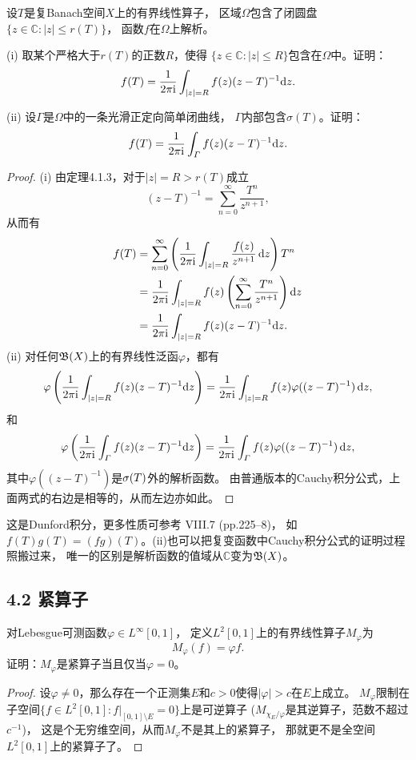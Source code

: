 \begin{21}
    设$T$是复Banach空间$X$上的有界线性算子，
    区域$\varOmega$包含了闭圆盘$\{z\in\mathbb{C}:|z|\leqslant r(T)\}$，
    函数$f$在$\varOmega$上解析。

    (i) 取某个严格大于$r(T)$的正数$R$，使得
    $\{z\in\mathbb{C}:|z|\leqslant R\}$包含在$\varOmega$中。证明：
    \[f(T)=\frac{1}{2\pi{\rm i}}\int_{|z|=R}f(z)(z-T)^{-1}{\rm d}z.\]

    (ii) 设$\varGamma$是$\varOmega$中的一条光滑正定向简单闭曲线，
    $\varGamma$内部包含$\sigma(T)$。证明：
    \[f(T)=\frac{1}{2\pi{\rm i}}\int_{\varGamma}f(z)(z-T)^{-1}{\rm d}z.\]
\end{21}
\begin{proof}
    (i) 由定理4.1.3，对于$|z|=R>r(T)$成立
    \[(z-T)^{-1}=\sum_{n=0}^{\infty}\frac{T^n}{z^{n+1}},\]
    从而有
    \begin{align*}
        f(T)&=\sum_{n=0}^{\infty}\left(\frac{1}{2\pi{\rm i}}\int_{|z|=R}\frac{f(z)}{z^{n+1}}\,{\rm d}z\right)T^n\\
        &=\frac{1}{2\pi{\rm i}}\int_{|z|=R}f(z)\left(\sum_{n=0}^{\infty}\frac{T^n}{z^{n+1}}\right){\rm d}z\\
        &=\frac{1}{2\pi{\rm i}}\int_{|z|=R}f(z)(z-T)^{-1}{\rm d}z.
    \end{align*}
    (ii) 对任何$\mathfrak{B}(X)$上的有界线性泛函$\varphi$，都有
    \[\varphi\left(\frac{1}{2\pi{\rm i}}\int_{|z|=R}f(z)(z-T)^{-1}{\rm d}z\right)
    =\frac{1}{2\pi{\rm i}}\int_{|z|=R}f(z)\varphi((z-T)^{-1})\,{\rm d}z,\]
    和
    \[\varphi\left(\frac{1}{2\pi{\rm i}}\int_{\varGamma}f(z)(z-T)^{-1}{\rm d}z\right)
    =\frac{1}{2\pi{\rm i}}\int_{\varGamma}f(z)\varphi((z-T)^{-1})\,{\rm d}z,\]
    其中$\varphi((z-T)^{-1})$是$\sigma(T)$外的解析函数。
    由普通版本的Cauchy积分公式，上面两式的右边是相等的，从而左边亦如此。
\end{proof}
\begin{remark*}
    这是Dunford积分，更多性质可参考\cite{Yo} VIII.7 (pp.225--8)，
    如$f(T)g(T)=(fg)(T)$。(ii)也可以把复变函数中Cauchy积分公式的证明过程照搬过来，
    唯一的区别是解析函数的值域从$\mathbb{C}$变为$\mathfrak{B}(X)$。
\end{remark*}

\subsection{4.2 紧算子}
\begin{6}
    对Lebesgue可测函数$\varphi \in L^\infty[0,1]$，
    定义$L^2[0,1]$上的有界线性算子$M_\varphi$为
    \[M_\varphi(f)=\varphi f.\]
    证明：$M_\varphi$是紧算子当且仅当$\varphi=0$。
\end{6}
\begin{proof}
    设$\varphi\ne0$，那么存在一个正测集$E$和$c>0$使得$|\varphi|>c$在$E$上成立。
    $M_\varphi$限制在子空间$\{f \in L^2[0,1]:f|_{[0,1] \setminus E}=0\}$上是可逆算子
    ($M_{\chi_E/\varphi}$是其逆算子，范数不超过$c^{-1}$)，
    这是个无穷维空间，从而$M_\varphi$不是其上的紧算子，
    那就更不是全空间$L^2[0,1]$上的紧算子了。
\end{proof}

